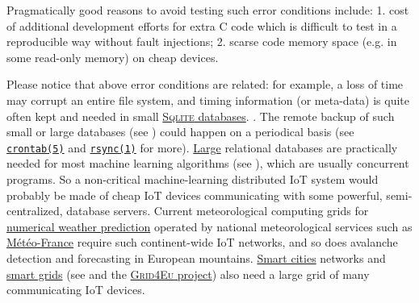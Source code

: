  Pragmatically good reasons to avoid testing such error conditions
  include: 1. cost of additional development
 efforts for extra C code which is difficult to test in a reproducible
 way   
 without fault injections; 2. scarse code memory space 
  (e.g. in some read-only memory)  on cheap devices.

 Please notice that above error conditions are related: for example, a
 loss of time may corrupt an entire file system,
  and timing information (or meta-data)
   is quite often kept and needed in
 small \href{http://sqlite.org/}{\textsc{Sqlite} databases}.
 . The remote backup
    of such
 small or large databases (see \cite{Date:2005:Database-in-Depth,
   kornacker:2015:impala}) could happen on a periodical basis (see
 \href{https://man7.org/linux/man-pages/man5/crontab.5.html}{\texttt{crontab(5)}}
 and 
 \href{https://man7.org/linux/man-pages/man1/rsync.1.html}{\texttt{rsync(1)}}
 for
 more). \href{https://softwareengineering.stackexchange.com/a/332071/40065}{Large}
 relational databases are practically needed for most machine learning
  algorithms (see
 \cite{flach:2012:machine-learning}), which are usually concurrent
  programs. So a non-critical machine-learning
 distributed IoT system would probably be made of cheap IoT devices
 communicating with some powerful, semi-centralized, database
  
  servers. Current meteorological computing
 grids for
 \href{https://en.wikipedia.org/wiki/Numerical_weather_prediction}{numerical
   weather prediction} operated by national meteorological services
 such as \href{http://meteofrance.com/}{Météo-France} require such
 continent-wide IoT networks, and so does 
  avalanche detection and forecasting in European
   
 mountains. \href{https://en.wikipedia.org/wiki/Smart_city}{Smart
   cities} networks and
 \href{https://en.wikipedia.org/wiki/Smart_grid}{smart grids} (see
 \cite{belarbi:2004:vehicle, mclaren:2015:sharing,
   delons:2008:pirandello, bakken:2014:smart-grids} and
  the
 \href{https://www.enedis.fr/grid4eu}{\textsc{Grid4Eu} project}) also
 need a large grid of many communicating IoT devices.

